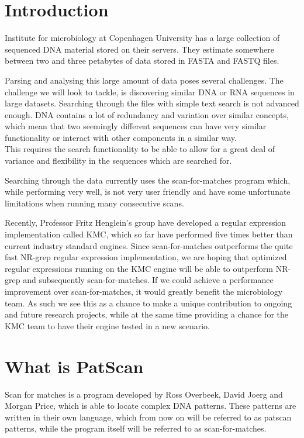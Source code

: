 \documentclass[12pt]{article}
\begin{document}
\newpage

\section{Introduction}

Institute for microbiology at Copenhagen University has a large collection of sequenced DNA material stored on their servers. They estimate somewhere between two and three petabytes of data stored in FASTA and FASTQ files.

Parsing and analysing this large amount of data poses several challenges. The challenge we will look to tackle, is discovering similar DNA or RNA sequences in large datasets. Searching through the files with simple text search is not advanced enough. DNA contains a lot of redundancy and variation over similar concepts, which mean that two seemingly different sequences can have very similar functionality or interact with other components in a similar way. \\
This requires the search functionality to be able to allow for a great deal of variance and flexibility in the sequences which are searched for.

Searching through the data currently uses the scan-for-matches program which, while performing very well, is not very user friendly and have some unfortunate limitations when running many consecutive scans.

Recently, Professor Fritz Henglein’s group have developed a regular expression implementation called KMC, which so far have performed five times better than current industry standard engines.
Since scan-for-matches outperforms the quite fast NR-grep\cite{nrgrep} regular expression implementation, we are hoping that optimized regular expressions running on the KMC engine will be able to outperform NR-grep and subsequently scan-for-matches.
If we could achieve a performance improvement over scan-for-matches, it would greatly benefit the microbiology team. As such we see this as a chance to make a unique contribution to ongoing and future research projects, while at the same time providing a chance for the KMC team to have their engine tested in a new scenario.

\newpage

\section{What is PatScan}

Scan for matches is a program developed by Ross Overbeek, David Joerg and Morgan Price, which is able to locate complex DNA patterns.\cite{scan-for-matches} These patterns are written in their own language, which from now on will be referred to as patscan patterns, while the program itself will be referred to as scan-for-matches.
\end{document}
